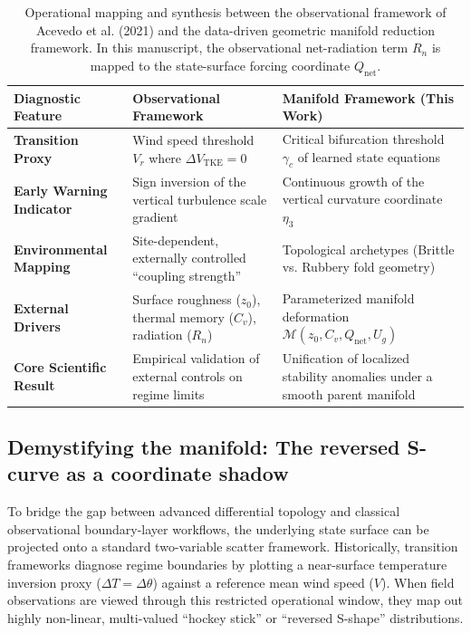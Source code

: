 \documentclass[12pt,a4paper]{article}
\begin{document}
\begin{table}[htbp]
\centering
\small
\setlength{\tabcolsep}{5pt}
\renewcommand{\arraystretch}{1.2}
\begin{tabularx}{\textwidth}{@{}>{\raggedright\arraybackslash}p{} >{\raggedright\arraybackslash}X >{\raggedright\arraybackslash}X@{}}
\toprule
\textbf{Diagnostic Feature} & \textbf{Observational Framework \citep{acevedo2021external}} & \textbf{Manifold Framework (This Work)} \\
\midrule
\textbf{Transition Proxy} & Wind speed threshold $V_r$ where $\Delta V_{\mathrm{TKE}} = 0$ & Critical bifurcation threshold $\gamma_c$ of learned state equations \\
\addlinespace
\textbf{Early Warning Indicator} & Sign inversion of the vertical turbulence scale gradient & Continuous growth of the vertical curvature coordinate $\eta_3$ \\
\addlinespace
\textbf{Environmental Mapping} & Site-dependent, externally controlled ``coupling strength'' & Topological archetypes (Brittle vs. Rubbery fold geometry) \\
\addlinespace
\textbf{External Drivers} & Surface roughness ($z_0$), thermal memory ($C_v$), radiation ($R_n$) & Parameterized manifold deformation $\mathcal{M}(z_0, C_v, Q_{\text{net}}, U_g)$ \\
\addlinespace
\textbf{Core Scientific Result} & Empirical validation of external controls on regime limits & Unification of localized stability anomalies under a smooth parent manifold \\
\bottomrule
\end{tabularx}
\caption{Operational mapping and synthesis between the observational framework of Acevedo et al. (2021) and the data-driven geometric manifold reduction framework. In this manuscript, the observational net-radiation term $R_n$ is mapped to the state-surface forcing coordinate $Q_{\text{net}}$.}
\label{tab:acevedo_comparison}
\end{table}

\subsection{Demystifying the manifold: The reversed S-curve as a coordinate shadow}
\label{subsec:reversed_s_demystification}

To bridge the gap between advanced differential topology and classical observational boundary-layer workflows, the underlying state surface can be projected onto a standard two-variable scatter framework. Historically, transition frameworks \citep[e.g.,][]{vignon2017, acevedo2021external} diagnose regime boundaries by plotting a near-surface temperature inversion proxy ($\Delta T = \Delta \theta$) against a reference mean wind speed ($V$). When field observations are viewed through this restricted operational window, they map out highly non-linear, multi-valued ``hockey stick'' or ``reversed S-shape'' distributions.
\end{document}
